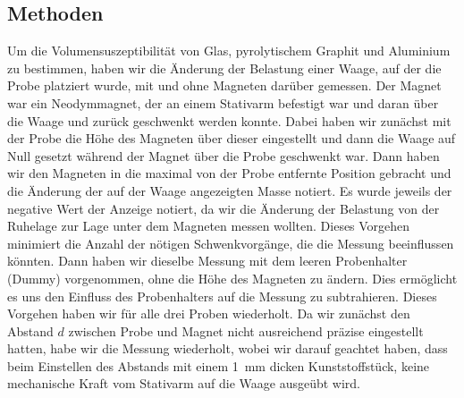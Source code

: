 \documentclass[
	a4paper,
	12pt,
	pagesize,
	ngerman
]{scrartcl}
\begin{document}
	\subsection{Methoden}
	Um die Volumensuszeptibilität von Glas, pyrolytischem Graphit und Aluminium zu bestimmen, haben wir die Änderung der Belastung einer Waage, auf der die Probe platziert wurde, mit und ohne Magneten darüber gemessen. Der Magnet war ein Neodymmagnet, der an einem Stativarm befestigt war und daran über die Waage und zurück geschwenkt werden konnte. Dabei haben wir zunächst mit der Probe die Höhe des Magneten über dieser eingestellt und dann die Waage auf Null gesetzt während der Magnet über die Probe geschwenkt war. Dann haben wir den Magneten in die maximal von der Probe entfernte Position gebracht und die Änderung der auf der Waage angezeigten Masse notiert. Es wurde jeweils der negative Wert der Anzeige notiert, da wir die Änderung der Belastung von der Ruhelage zur Lage unter dem Magneten messen wollten. Dieses Vorgehen minimiert die Anzahl der nötigen Schwenkvorgänge, die die Messung beeinflussen könnten. Dann haben wir dieselbe Messung mit dem leeren Probenhalter (Dummy) vorgenommen, ohne die Höhe des Magneten zu ändern. Dies ermöglicht es uns den Einfluss des Probenhalters auf die Messung zu subtrahieren. Dieses Vorgehen haben wir für alle drei Proben wiederholt. Da wir zunächst den Abstand $d$ zwischen Probe und Magnet nicht ausreichend präzise eingestellt hatten, habe wir die Messung wiederholt, wobei wir darauf geachtet haben, dass beim Einstellen des Abstands mit einem \SI{1}{\milli \meter} dicken Kunststoffstück, keine mechanische Kraft vom Stativarm auf die Waage ausgeübt wird. 
\end{document}
